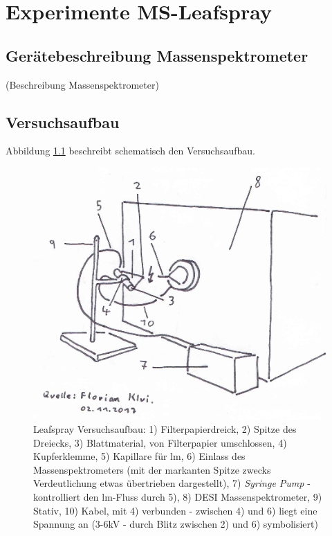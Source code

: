 \chapter{Experimente MS-Leafspray}

\section{Gerätebeschreibung Massenspektrometer}

(Beschreibung Massenspektrometer)

\section{Versuchsaufbau} \label{sec:Versuchsaufbau}

Abbildung \ref{fig:LeafsprayVersuchsaufbau} beschreibt schematisch den Versuchsaufbau. 

\begin{figure}[!hbtp]
  \centering
  \includegraphics[scale=0.5]{figures/Kapitel4/VWA_MSLeafspray_Versuchsaufbau.png}
  \caption[MS-Leafspray Versuchsaufbau, Quelle: Autor]{Leafspray Versuchsaufbau: 1) Filterpapierdreick, 2) Spitze des Dreiecks, 3) Blattmaterial, von Filterpapier umschlossen, 4) Kupferklemme, 5) Kapillare für \gls{lm}, 6) Einlass des Massenspektrometers (mit der markanten Spitze zwecks Verdeutlichung etwas übertrieben dargestellt), 7) \textit{Syringe Pump} - kontrolliert den \gls{lm}-Fluss durch 5), 8) DESI Massenspektrometer, 9) Stativ, 10) Kabel, mit 4) verbunden - zwischen 4) und 6) liegt eine Spannung   an (3-6kV - durch Blitz zwischen 2) und 6) symbolisiert)}
  \label{fig:LeafsprayVersuchsaufbau}
\end{figure}

